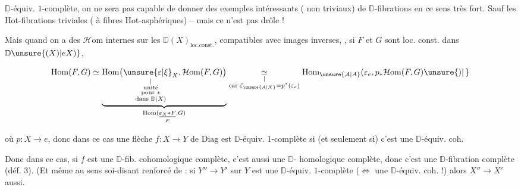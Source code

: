 

\margin{$\unsure{\ast|\times}$}

$\mathbb D$-équiv. $1$-complète,  on ne sera pas capable de donner des exemples intéressants ( non  triviaux) de $\mathbb D$-fibrations en ce sens très fort. Sauf les Hot-fibrations triviales ( à fibres Hot-asphériques) -- mais ce n'est pas drôle !

Mais quand on a des  $\mathcal H\mathrm{om}$ internes  sur les $\mathbb D(X)_{\mathrm{loc.const.}}$, compatibles avec \margin{$\longrightarrow$}images inverses, , si $F$ et $G$ sont loc.  const. dans $\mathbb D\unsure{(X)|eX)}$,

\[
\mathrm{Hom}(F,G)\simeq
\underbrace{\mathrm{Hom}\bigl(\underset{\substack{\vert\\\text{unité}\\\text{pour }*\\\text{dans }\mathbb D(X)}}{\unsure{\varepsilon|\xi}_X},\mathcal H\mathrm{om}(F,G)\bigr)}
_{\mathrm{Hom}(\underset{F}{\underline{\varepsilon_X*F}},G)}
\underset{\substack{\vert\\\text{car }\bar\varepsilon_{\unsure{A|X}}=p^*(\varepsilon_e)}}{\simeq}
\mathrm{Hom}_{\unsure{\mathcal A|A}}(\varepsilon_e,p_*\mathcal H\mathrm{om}(F,G)\unsure{)|\,}
\]

où $p:X\to e$, donc dans ce cas une flèche $f:X\to Y$ de $\mathrm{Diag}$ est  $\mathbb D$-équiv. $1$-complète si (et seulement si) c'est une $\mathbb D$-équiv. coh.

Donc dans ce cas,  si $f$ est une $\mathbb D$-fib. cohomologique complète, c'est aussi une $\mathbb D$- homologique complète, donc c'est une $\mathbb D$-fibration complète (déf. 3). (Et même au sens soi-disant renforcé de   : si $Y''\to Y'$ sur $Y$ est une $\mathbb D$-équiv. $1$-complète ($\Longleftrightarrow$ une $\mathbb D$-équiv. coh. !) alors $X''\to X'$ aussi.

